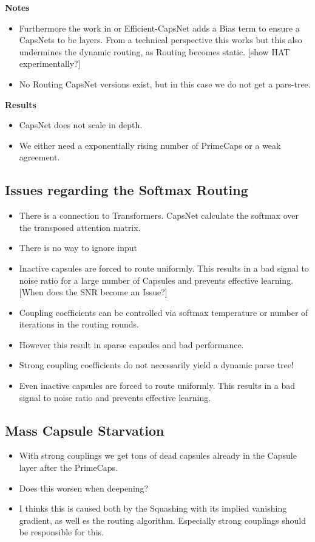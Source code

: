 \documentclass{article}
\begin{document}
\textbf{Notes}
\begin{itemize}
	\item Furthermore the work in \cite{prl/PeerSR21} or Efficient-CapsNet adds a Bias term to ensure a CapsNets to be layers.  From a technical perspective this works but this also undermines the dynamic routing, as Routing becomes static. [show HAT experimentally?]
	\item No Routing CapsNet versions exist, but in this case we do not get a pars-tree.
\end{itemize}

\textbf{Results}
\begin{itemize}
	\item CapsNet does not scale in depth. 
	\item We either need a exponentially rising number of PrimeCaps or a weak agreement.
\end{itemize}

\subsection{Issues regarding the Softmax Routing}
\begin{itemize}
	\item There is a connection to Transformers. CapsNet calculate the softmax over the transposed attention matrix.
	\item There is no way to ignore input
	\item Inactive capsules are forced to route uniformly. This results in a bad signal to noise ratio for a large number of Capsules and prevents effective learning.  [When does the SNR become an Issue?]
	\item Coupling coefficients can be controlled via softmax temperature or number of iterations in the routing rounds.
	\item However this result in sparse capsules and bad performance.
	\item Strong coupling coefficients do not necessarily yield a dynamic parse tree!
	\item Even inactive capsules are forced to route uniformly. This results in a bad signal to noise ratio and prevents effective learning.
\end{itemize}

\subsection{Mass Capsule Starvation}
\begin{itemize}
	\item With strong couplings we get tons of dead capsules already in the Capsule layer after the PrimeCaps.
	\item Does this worsen when deepening?
	\item I thinks this is caused both by the Squashing with its implied vanishing gradient, as well es the routing algorithm. Especially strong couplings should be responsible for this.
\end{itemize}
\end{document}

